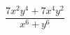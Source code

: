 \begin{ex}[type=expression]
	\begin{condition}
		\(\dfrac{7x^2y^4+7x^4y^2}{x^6+y^6}\)
	\end{condition}
\end{ex}